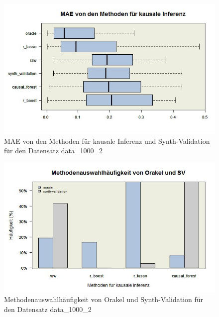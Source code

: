 \documentclass[12pt,a4paper,twoside]{scrartcl}
\numberwithin{equation}{section}
\newcounter{mypagecount}%
\newenvironment{interlude}{%
  \clearpage
  \setcounter{mypagecount}{\value{page}}%
  \thispagestyle{empty}%
  \pagestyle{empty}%
}{%
  \clearpage
  \setcounter{page}{\value{mypagecount}}%
}
\begin{document}
\begin{interlude}
\begin{appendices}
\begin{center}
\begin{figure}[H]
    \centering
    \includegraphics[height=0.5\textwidth, width=1\textwidth]{figures/plots/appendix/rawData1000bBoxplot.jpeg}
    \caption[MAE von den Methoden für kausale Inferenz und Synth-Validation für den Datensatz data\_1000\_2]{MAE von den Methoden für kausale Inferenz und Synth-Validation für den Datensatz data\_1000\_2}
  \end{figure}
\end{center}

\begin{center}
\begin{figure}[H]
    \centering
    \includegraphics[height=0.5\textwidth, width=1\textwidth]{figures/plots/appendix/rawData1000bBarplot.jpeg}
    \caption[Methodenauswahlhäufigkeit von Orakel und Synth-Validation für den Datensatz data\_1000\_2]{Methodenauswahlhäufigkeit von Orakel und Synth-Validation für den Datensatz data\_1000\_2}
  \end{figure}
\end{center}


\end{appendices}
\end{interlude}
\end{document}
